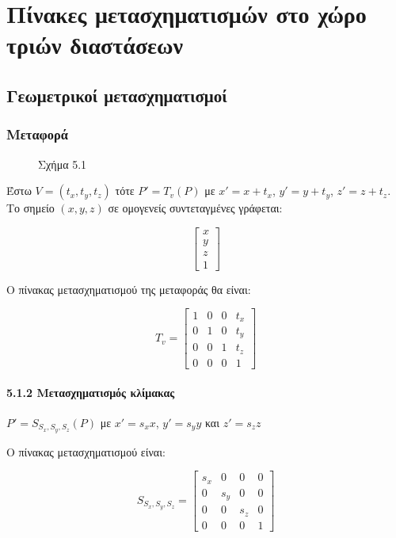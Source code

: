\chapter{Πίνακες μετασχηματισμών στο χώρο τριών διαστάσεων}

\section{Γεωμετρικοί μετασχηματισμοί}

\subsection{Μεταφορά}

\begin{figure}[h]
\centering
\caption{Σχήμα 5.1}
\end{figure}


Έστω \( V = (t_x, t_y, t_z) \) τότε \( P' = T_v(P) \) με \( x' = x + t_x \), \( y' = y + t_y \), \( z' = z + t_z \). Το σημείο \((x, y, z)\) σε ομογενείς συντεταγμένες γράφεται:

\[
\begin{bmatrix}
x \\
y \\
z \\
1
\end{bmatrix}
\]

Ο πίνακας μετασχηματισμού της μεταφοράς θα είναι:

\[
T_v =
\begin{bmatrix}
1 & 0 & 0 & t_x \\
0 & 1 & 0 & t_y \\
0 & 0 & 1 & t_z \\
0 & 0 & 0 & 1
\end{bmatrix}
\]

\subsubsection*{5.1.2 Μετασχηματισμός κλίμακας}

\( P' = S_{S_x, S_y, S_z}(P) \) με \( x' = s_x x \), \( y' = s_y y \) και \( z' = s_z z \)

Ο πίνακας μετασχηματισμού είναι:

\[
S_{S_x, S_y, S_z} = 
\begin{bmatrix}
s_x & 0 & 0 & 0 \\
0 & s_y & 0 & 0 \\
0 & 0 & s_z & 0 \\
0 & 0 & 0 & 1
\end{bmatrix}
\]


